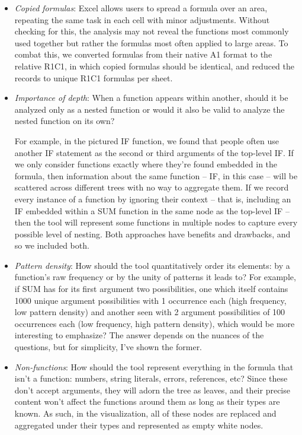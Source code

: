 \documentclass[conference]{IEEEtran}
\begin{document}
\begin{itemize}
	\item \textit{Copied formulas}: Excel allows users to spread a formula over an area, repeating the same task in each cell with minor adjustments. Without checking for this, the analysis may not reveal the functions most commonly used together but rather the formulas most often applied to large areas. To combat this, we converted formulas from their native A1 format to the relative R1C1, in which copied formulas should be identical, and reduced the records to unique R1C1 formulas per sheet.
	\item \textit{Importance of depth}: When a function appears within another, should it be analyzed only as a nested function or would it also be valid to analyze the nested function on its own?  \par
	For example, in the pictured IF function, we found that people often use another IF statement as the second or third arguments of the top-level IF. If we only consider functions exactly where they're found embedded in the formula, then information about the same function -- IF, in this case -- will be scattered across different trees with no way to aggregate them. If we record every instance of a function by ignoring their context -- that is, including an IF embedded within a SUM function in the same node as the top-level IF -- then the tool will represent some functions in multiple nodes to capture every possible level of nesting. Both approaches have benefits and drawbacks, and so we included both.
	\item \textit{Pattern density}: How should the tool quantitatively order its elements: by a function's raw frequency or by the unity of patterns it leads to? For example, if SUM has for its first argument two possibilities, one which itself contains 1000 unique argument possibilities with 1 occurrence each (high frequency, low pattern density) and another seen with 2 argument possibilities of 100 occurrences each (low frequency, high pattern density), which would be more interesting to emphasize? The answer depends on the nuances of the questions, but for simplicity, I've shown the former.
	\item \textit{Non-functions}: How should the tool represent everything in the formula that isn't a function: numbers, string literals, errors, references, etc? Since these don't accept arguments, they will adorn the tree as leaves, and their precise content won't affect the functions around them as long as their types are known. As such, in the visualization, all of these nodes are replaced and aggregated under their types and represented as empty white nodes.

\end{itemize}
\end{document}
